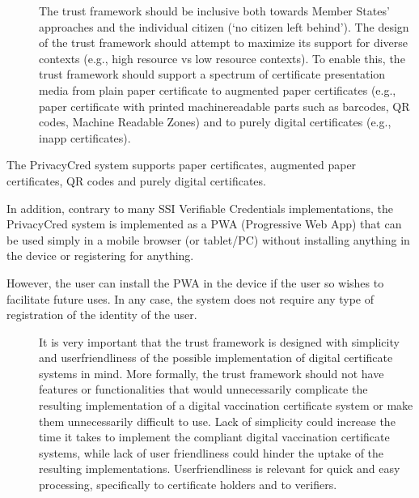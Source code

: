 \documentclass[a4paper,12pt,english]{sphinxhowto}
\begin{document}
\begin{description}
\item[{}] \leavevmode
\sphinxAtStartPar
The trust framework should be inclusive both towards Member States’ approaches and the individual citizen (‘no citizen left behind’). The design of the trust framework should attempt to maximize its support for diverse contexts (e.g., high resource vs low resource contexts). To enable this, the trust framework should support a spectrum of certificate presentation media from plain paper certificate to augmented paper certificates (e.g., paper certificate with printed machinereadable parts such as barcodes, QR codes, Machine Readable Zones) and to purely digital certificates (e.g., in\sphinxhyphen{}app certificates).

\end{description}

\begin{sphinxShadowBox}

\sphinxAtStartPar
The PrivacyCred system supports paper certificates, augmented paper certificates, QR codes and purely digital certificates.

\sphinxAtStartPar
In addition, contrary to many SSI Verifiable Credentials implementations, the PrivacyCred system is implemented as a PWA (Progressive Web App) that can be used simply in a mobile browser (or tablet/PC) without installing anything in the device or registering for anything.

\sphinxAtStartPar
However, the user can install the PWA in the device if the user so wishes to facilitate future uses. In any case, the system does not require any type of registration of the identity of the user.
\end{sphinxShadowBox}
\begin{description}
\item[{}] \leavevmode
\sphinxAtStartPar
It is very important that the trust framework is designed with simplicity and user\sphinxhyphen{}friendliness of the possible implementation of digital certificate systems in mind. More formally, the trust framework should not have features or functionalities that would unnecessarily complicate the resulting implementation of a digital vaccination certificate system or make them unnecessarily difficult to use. Lack of simplicity could increase the time it takes to implement the compliant digital vaccination certificate systems, while lack of user friendliness could hinder the uptake of the resulting implementations. User\sphinxhyphen{}friendliness is relevant for quick and easy processing, specifically to certificate holders and to verifiers.

\end{description}
\end{document}
